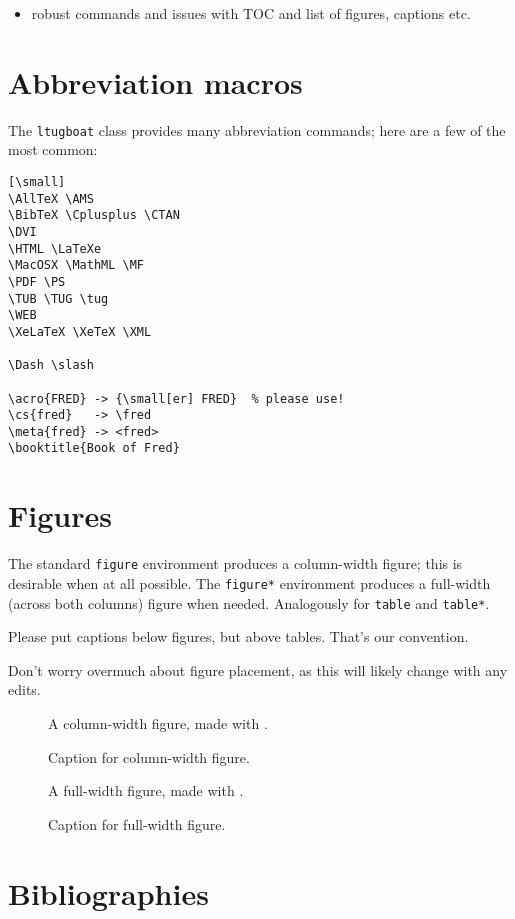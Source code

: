 \documentclass{ltugboat}
\begin{document}
\begin{itemize}
  \begin{itemize}
  \item robust commands and issues with TOC and list of figures, captions
    etc.
  \end{itemize}
\end{itemize}


\section{Abbreviation macros}

The \texttt{ltugboat} class provides many abbreviation commands; here
are a few of the most common:

\begin{verbatim}[\small]
\AllTeX \AMS
\BibTeX \Cplusplus \CTAN
\DVI
\HTML \LaTeXe
\MacOSX \MathML \MF
\PDF \PS
\TUB \TUG \tug
\WEB
\XeLaTeX \XeTeX \XML

\Dash \slash

\acro{FRED} -> {\small[er] FRED}  % please use!
\cs{fred}   -> \fred
\meta{fred} -> <fred>
\booktitle{Book of Fred}
\end{verbatim}

\section{Figures}

The standard \texttt{figure} environment produces a column-width figure;
this is desirable when at all possible. The \texttt{figure*} environment
produces a full-width (across both columns) figure when needed.
Analogously for \texttt{table} and \texttt{table*}. 

Please put captions below figures, but above tables. That's our
convention.

Don't worry overmuch about figure placement, as this will likely change
with any edits.

\begin{figure}
A column-width figure, made with .
\caption{Caption for column-width figure.}
\label{fig.colwidth}
\end{figure}

\begin{figure*}
A full-width figure, made with .
\caption{Caption for full-width figure.}
\label{fig.fullwidth}
\end{figure*}

\section{Bibliographies}
\end{document}
